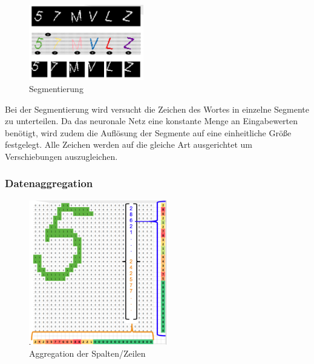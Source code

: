   \begin{figure}
  \vspace{-35pt}
  \begin{center}
    \includegraphics[width=5cm]{res/Segmentierung.png}
  \end{center}
  \vspace{-5pt}
  \caption{Segmentierung}
  \vspace{-10pt}
\end{figure}


Bei der Segmentierung wird versucht die Zeichen des Wortes in einzelne Segmente
zu unterteilen. Da das neuronale Netz eine konstante Menge an Eingabewerten
benötigt, wird zudem die Auflösung der Segmente auf eine einheitliche Größe
festgelegt. Alle Zeichen werden auf die gleiche Art ausgerichtet um
Verschiebungen auszugleichen.

\subsubsection{Datenaggregation}

\begin{figure}
  \begin{center}
    \includegraphics[width=6cm]{res/Aggregation.png}
  \end{center}
  \vspace{-5pt}
  \caption{Aggregation der Spalten/Zeilen}
  \vspace{-10pt}
\end{figure}


